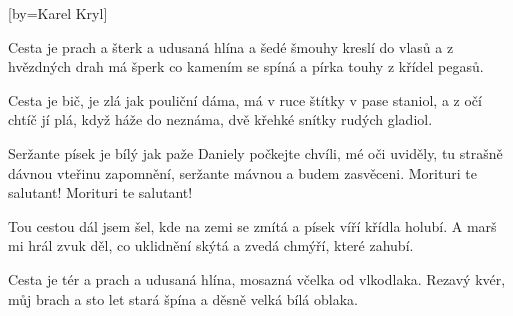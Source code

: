 [by={Karel Kryl}]

\beginverse{}
Cesta je prach a šterk a udusaná hlína
a šedé šmouhy kreslí do vlasů
\lrep{} a z hvězdných drah má šperk co kamením se spíná
a pírka touhy z křídel pegasů. \rrep{}
\endverse{}

\beginverse{}
Cesta je bič, je zlá jak pouliční dáma,
má v ruce štítky v pase staniol,
\lrep{} a z očí chtíč jí plá, když háže do neznáma,
dvě křehké snítky rudých gladiol. \rrep{}
\endverse{}

\beginchorus{}
Seržante písek je bílý jak paže Daniely
počkejte chvíli, mé oči uviděly,
tu strašně dávnou vteřinu zapomnění,
seržante mávnou a budem zasvěceni.
Morituri te salutant! Morituri te salutant!
\endchorus{}

\beginverse{}
Tou cestou dál jsem šel, kde na zemi se zmítá
a písek víří křídla holubí.
\lrep{} A marš mi hrál zvuk děl, co uklidnění skýtá
a zvedá chmýří, které zahubí. \rrep{}
\endverse{}

\beginverse{}
Cesta je tér a prach a udusaná hlína,
mosazná včelka od vlkodlaka.
\lrep{} Rezavý kvér, můj brach a sto let stará špína
a děsně velká bílá oblaka. \rrep{}
\endverse{}

\beginchorus{}
\phantom{}
\endchorus{}

\endsong{}
